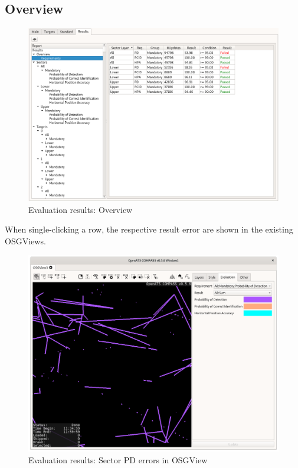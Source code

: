 \subsection{Overview}
\begin{figure}[H]
  \hspace*{-2cm}
    \includegraphics[width=18cm,frame]{../screenshots/eval_results_overview.png}
  \caption{Evaluation results: Overview}
\end{figure}

When single-clicking a row, the respective result error are shown in the existing OSGViews.

\begin{figure}[H]
  \hspace*{-2.5cm}
    \includegraphics[width=19cm]{../screenshots/eval_results_pd_sum_osgview.png}
  \caption{Evaluation results: Sector PD errors in OSGView}
\end{figure}

